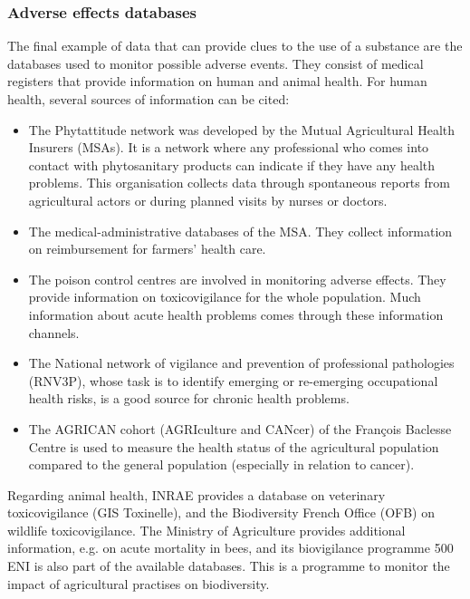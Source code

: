 
\subsubsection{Adverse effects databases}

The final example of data that can provide clues to the use of a substance are the databases used to monitor possible adverse events. They consist of medical registers that provide information on human and animal health. 
For human health, several sources of information can be cited: 
\begin{itemize}
\item The Phytattitude network was developed by the Mutual Agricultural Health Insurers (MSAs). It is a network where any professional who comes into contact with phytosanitary products can indicate if they have any health problems. This organisation collects data through spontaneous reports from agricultural actors or during planned visits by nurses or doctors.
\item The medical-administrative databases of the MSA. They collect information on reimbursement for farmers' health care.
\item The poison control centres are involved in monitoring adverse effects. They provide information on toxicovigilance for the whole population. Much information about acute health problems comes through these information channels.
\item The National network of vigilance and prevention of professional pathologies (RNV3P), whose task is to identify emerging or re-emerging occupational health risks, is a good source for chronic health problems.
\item The AGRICAN cohort (AGRIculture and CANcer) of the François Baclesse Centre is used to measure the health status of the agricultural population compared to the general population (especially in relation to cancer).
\end{itemize}

Regarding animal health, INRAE provides a database on veterinary toxicovigilance (GIS Toxinelle), and the Biodiversity French Office (OFB) on wildlife toxicovigilance. The Ministry of Agriculture provides additional information, e.g. on acute mortality in bees, and its biovigilance programme 500 ENI is also part of the available databases. This is a programme to monitor the impact of agricultural practises on biodiversity.

